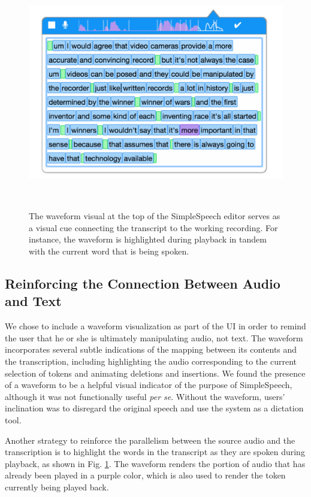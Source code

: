 \begin{figure}
	\centering
	\includegraphics[width=\columnwidth,keepaspectratio]{figures/playback}
	\caption{The waveform visual at the top of the SimpleSpeech editor serves as a visual cue connecting the transcript to the working recording. For instance, the waveform is highlighted during playback in tandem with the current word that is being spoken.}~\label{fig:playback}
\end{figure}

\subsection{Reinforcing the Connection Between Audio and Text}
We chose to include a waveform visualization as part of the UI in order to remind the user that he or she is ultimately manipulating audio, not text. The waveform incorporates several subtle indications of the mapping between its contents and the transcription, including highlighting the audio corresponding to the current selection of tokens and animating deletions and insertions.
We found the presence of a waveform to be a helpful visual indicator of the purpose of SimpleSpeech, although it was not functionally useful \textit{per se}.
Without the waveform, users' inclination was to disregard the original speech and use the system as a dictation tool.

Another strategy to reinforce the parallelism between the source audio and the transcription is to highlight the words in the transcript as they are spoken during playback, as shown in Fig. \ref{fig:playback}.
The waveform renders the portion of audio that has already been played in a purple color, which is also used to render the token currently being played back.

